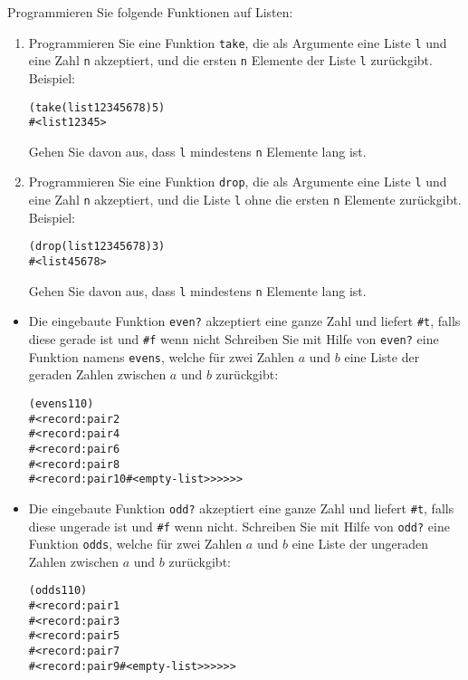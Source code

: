 \begin{aufgabe}
  Programmieren Sie folgende Funktionen auf Listen:
  \begin{enumerate}
  \item Programmieren Sie eine Funktion \texttt{take}, die als
    Argumente eine Liste \texttt{l} und eine Zahl \texttt{n}
    akzeptiert, und die ersten \texttt{n} Elemente der Liste
    \texttt{l} zurückgibt. Beispiel:
    \begin{alltt}
      (take (list 1 2 3 4 5 6 7 8) 5)
      \evalsto{} #<list 1 2 3 4 5>
    \end{alltt}
    Gehen Sie davon aus, dass \texttt{l} mindestens \texttt{n}
    Elemente lang ist.

  \item Programmieren Sie eine Funktion \texttt{drop}, die als
    Argumente eine Liste \texttt{l} und eine Zahl \texttt{n}
    akzeptiert, und die Liste \texttt{l} ohne die ersten \texttt{n}
    Elemente zurückgibt.  Beispiel:
    \begin{alltt}
      (drop (list 1 2 3 4 5 6 7 8) 3)
      \evalsto{} #<list 4 5 6 7 8>
    \end{alltt}
    Gehen Sie davon aus, dass \texttt{l} mindestens \texttt{n}
    Elemente lang ist.
    \end{enumerate}
\end{aufgabe}


\begin{aufgabe}\label{ex:evensodds}
  \begin{itemize}
  \item
    Die eingebaute Funktion \texttt{even?}
    akzeptiert eine ganze Zahl und liefert \verb|#t|, falls diese
    gerade ist und \verb|#f| wenn nicht
    Schreiben Sie mit Hilfe von \texttt{even?}
    eine Funktion namens \texttt{evens}, welche für zwei
    Zahlen $a$ und $b$ eine Liste der geraden Zahlen zwischen $a$ und
    $b$ zurückgibt:
\begin{alltt}
(evens 1 10)
\evalsto{} #<record:pair 2
     #<record:pair 4
       #<record:pair 6
         #<record:pair 8
           #<record:pair 10 #<empty-list>>>>>>
\end{alltt}
  \item
    Die eingebaute Funktion \texttt{odd?}
    akzeptiert eine ganze Zahl und liefert \verb|#t|, falls diese
    ungerade ist und \verb|#f| wenn nicht.
    Schreiben Sie mit Hilfe von \texttt{odd?} eine Funktion \texttt{odds}, welche für zwei
    Zahlen $a$ und $b$ eine Liste der ungeraden Zahlen zwischen $a$ und $b$
    zurückgibt:
\begin{alltt}
(odds 1 10)
\evalsto{} #<record:pair 1
     #<record:pair 3
       #<record:pair 5
         #<record:pair 7
           #<record:pair 9 #<empty-list>>>>>>
\end{alltt}
  \end{itemize}
\end{aufgabe}

